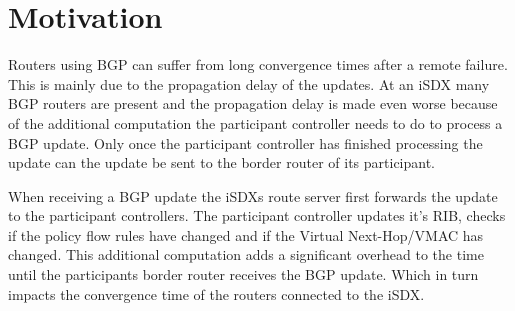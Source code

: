 
\chapter{\label{chapter3}Motivation}

Routers using BGP can suffer from long convergence times after a remote failure. This is mainly due to the propagation delay of the updates. At an iSDX many BGP routers are present and the propagation delay is made even worse because of the additional computation the participant controller needs to do to process a BGP update. Only once the participant controller has finished processing the update can the update be sent to the border router of its participant.  

When receiving a BGP update the iSDXs route server first forwards the update to the participant controllers. The participant controller updates it's RIB, checks if the policy flow rules have changed and if the Virtual Next-Hop/VMAC has changed. This additional computation adds a significant  overhead to the time until the participants border router receives the BGP update. Which in turn impacts the convergence time of the routers connected to the iSDX.

